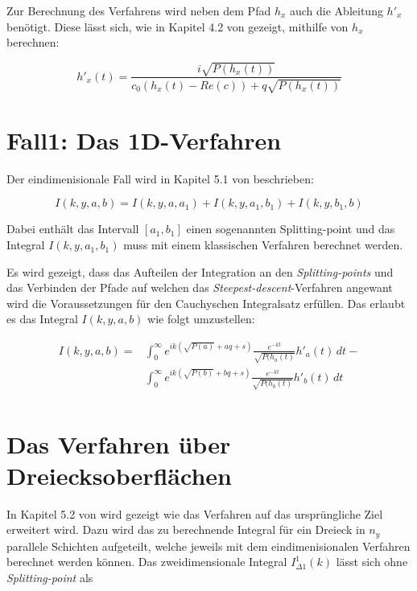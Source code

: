 Zur Berechnung des Verfahrens wird neben dem Pfad $h_x$ auch die Ableitung $h'_x$ benötigt.
Diese lässt sich, wie in Kapitel 4.2 von \cite{gasperini:hal-03209144} gezeigt, mithilfe von $h_x$ berechnen:

\begin{equation}
    h'_x(t) = \frac{i\sqrt{P(h_x(t))}}{c_0(h_x(t)-Re(c))+q\sqrt{P(h_x(t))}}
\end{equation}


\section{Fall1: Das 1D-Verfahren}

Der eindimenisionale Fall wird in Kapitel 5.1 von \cite{gasperini:hal-03209144} beschrieben: 

\begin{equation}
    I(k,y,a,b) = I(k,y,a,a_1) + I(k,y,a_1, b_1) + I(k,y,b_1,b)
\end{equation}

Dabei enthält das Intervall $[a_1,b_1]$ einen sogenannten Splitting-point und das Integral $I(k,y,a_1,b_1)$ muss mit einem klassischen Verfahren berechnet werden.


Es wird gezeigt, dass das Aufteilen der Integration an den \textit{Splitting-points} und das Verbinden der Pfade auf welchen das \textit{Steepest-descent}-Verfahren angewant wird die Voraussetzungen für den Cauchyschen Integralsatz erfüllen.
Das erlaubt es das Integral $I(k,y,a,b)$ wie folgt umzustellen:

\begin{equation}
    \begin{aligned}
    I(k,y,a,b) =& \int_{0}^{\infty} e^{ik(\sqrt{P(a)} + aq +s)} \frac{e^{-kt}}{\sqrt{P(h_a(t)}} h'_a(t)\,dt -\\
    & \int_{0}^{\infty} e^{ik(\sqrt{P(b)} + bq +s)} \frac{e^{-kt}}{\sqrt{P(h_b(t)}} h'_b(t)\,dt \\
    \end{aligned}
\end{equation}

\section{Das Verfahren über Dreiecksoberflächen}

In Kapitel 5.2 von \cite*{gasperini:hal-03209144} wird gezeigt wie das Verfahren auf das ursprüngliche Ziel erweitert wird.
Dazu wird das zu berechnende Integral für ein Dreieck in $n_y$ parallele Schichten aufgeteilt, welche jeweils mit dem eindimenisionalen Verfahren berechnet werden können.
Das zweidimensionale Integral $I_{\Delta1}^1(k)$ lässt sich ohne \textit{Splitting-point} als


